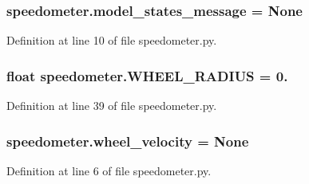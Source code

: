\subsubsection[{\texorpdfstring{model\+\_\+states\+\_\+message}{model_states_message}}]{\setlength{\rightskip}{0pt plus 5cm}speedometer.\+model\+\_\+states\+\_\+message = None}\hypertarget{namespacespeedometer_add00b4d69fb6713b1aca36de3240e3b2}{}\label{namespacespeedometer_add00b4d69fb6713b1aca36de3240e3b2}


Definition at line 10 of file speedometer.\+py.

\subsubsection[{\texorpdfstring{W\+H\+E\+E\+L\+\_\+\+R\+A\+D\+I\+US}{WHEEL_RADIUS}}]{\setlength{\rightskip}{0pt plus 5cm}float speedometer.\+W\+H\+E\+E\+L\+\_\+\+R\+A\+D\+I\+US = 0.}\hypertarget{namespacespeedometer_a5ec2676909937c0711ae29e3b7dfe8ba}{}\label{namespacespeedometer_a5ec2676909937c0711ae29e3b7dfe8ba}


Definition at line 39 of file speedometer.\+py.

\subsubsection[{\texorpdfstring{wheel\+\_\+velocity}{wheel_velocity}}]{\setlength{\rightskip}{0pt plus 5cm}speedometer.\+wheel\+\_\+velocity = None}\hypertarget{namespacespeedometer_a4f329df61648541a047c1ceb436db5cb}{}\label{namespacespeedometer_a4f329df61648541a047c1ceb436db5cb}


Definition at line 6 of file speedometer.\+py.

